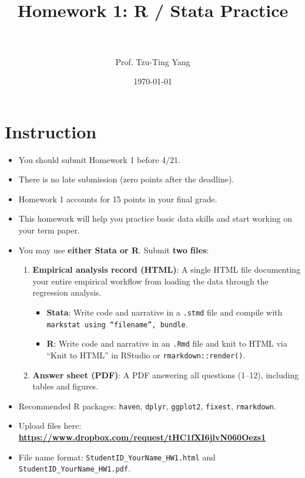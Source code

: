 \documentclass[paper=a4, fontsize=11pt]{scrartcl}
\title{
\normalfont \normalsize
\horrule{0.5pt} \\[0.4cm]
\huge Homework 1: R / Stata Practice \\
\horrule{2pt} \\[0.5cm]
}
\author{Prof. Tzu-Ting Yang}
\date{\normalsize\today}
\begin{document}
\maketitle


\section*{Instruction}

\begin{itemize}
\item[\textbullet] You should submit Homework 1 before 4/21.
\item[\textbullet] There is no late submission (zero points after the deadline).
\item[\textbullet] Homework 1 accounts for 15 points in your final grade.
\item[\textbullet] This homework will help you practice basic data skills and start working on your term paper.
\item[\textbullet] You may use \textbf{either Stata or R}. Submit \textbf{two files}:
  \begin{enumerate}
    \item \textbf{Empirical analysis record (HTML)}: A single HTML file documenting your entire empirical workflow from loading the data through the regression analysis.
    \begin{itemize}
      \item \textbf{Stata}: Write code and narrative in a \texttt{.stmd} file and compile with \texttt{markstat using ``filename'', bundle}.
      \item \textbf{R}: Write code and narrative in an \texttt{.Rmd} file and knit to HTML via ``Knit to HTML'' in RStudio or \texttt{rmarkdown::render()}.
    \end{itemize}
    \item \textbf{Answer sheet (PDF)}: A PDF answering all questions (1--12), including tables and figures.
  \end{enumerate}
\item[\textbullet] Recommended R packages: \texttt{haven}, \texttt{dplyr}, \texttt{ggplot2}, \texttt{fixest}, \texttt{rmarkdown}.
\item[\textbullet] Upload files here: \textbf{\url{https://www.dropbox.com/request/tHC1fXI6jlvN060Oezs1}}
\item[\textbullet] File name format: \texttt{StudentID\_YourName\_HW1.html} and \texttt{StudentID\_YourName\_HW1.pdf}.
\end{itemize}
\end{document}
